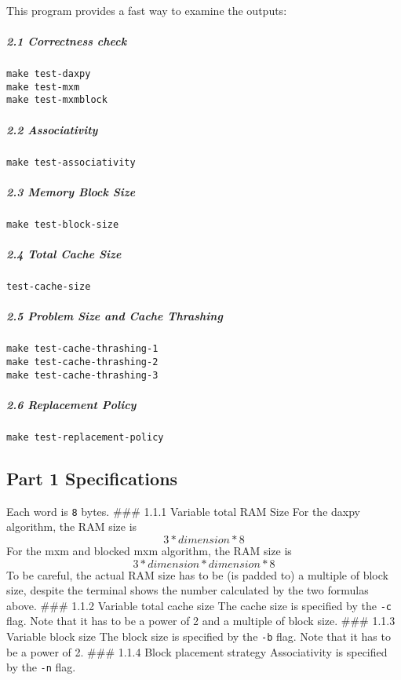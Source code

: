 \documentclass[11pt]{article}
\begin{document}
This program provides a fast way to examine the outputs:

\subparagraph{2.1 Correctness check}\label{correctness-check}

\begin{verbatim}
make test-daxpy
make test-mxm
make test-mxmblock
\end{verbatim}

\subparagraph{2.2 Associativity}\label{associativity}

\begin{verbatim}
make test-associativity
\end{verbatim}

\subparagraph{2.3 Memory Block Size}\label{memory-block-size}

\begin{verbatim}
make test-block-size
\end{verbatim}

\subparagraph{2.4 Total Cache Size}\label{total-cache-size}

\begin{verbatim}
test-cache-size
\end{verbatim}

\subparagraph{2.5 Problem Size and Cache
Thrashing}\label{problem-size-and-cache-thrashing}

\begin{verbatim}
make test-cache-thrashing-1
make test-cache-thrashing-2
make test-cache-thrashing-3
\end{verbatim}

\subparagraph{2.6 Replacement Policy}\label{replacement-policy}

\begin{verbatim}
make test-replacement-policy
\end{verbatim}

    \subsection{Part 1 Specifications}\label{part-1-specifications}

Each word is \texttt{8} bytes. \#\#\# 1.1.1 Variable total RAM Size For
the daxpy algorithm, the RAM size is \[3*dimension*8\] For the mxm and
blocked mxm algorithm, the RAM size is \[3*dimension*dimension*8\] To be
careful, the actual RAM size has to be (is padded to) a multiple of
block size, despite the terminal shows the number calculated by the two
formulas above. \#\#\# 1.1.2 Variable total cache size The cache size is
specified by the \texttt{-c} flag. Note that it has to be a power of 2
and a multiple of block size. \#\#\# 1.1.3 Variable block size The block
size is specified by the \texttt{-b} flag. Note that it has to be a
power of 2. \#\#\# 1.1.4 Block placement strategy Associativity is
specified by the \texttt{-n} flag.
\end{document}
